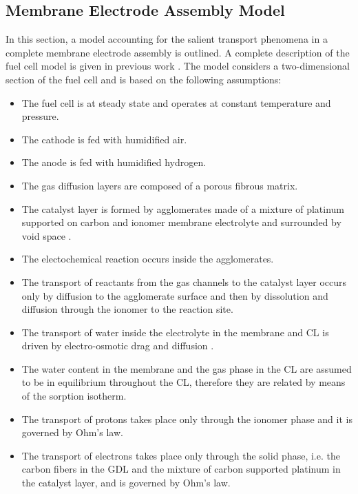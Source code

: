 \documentclass[]{elsart}
\begin{document}
\subsection{Membrane Electrode Assembly Model} \label{sec:CS:MEA}
  In this section, a model accounting for the salient transport phenomena in a complete membrane electrode assembly is outlined. A complete description of the fuel cell model is given in previous work \cite{Secanell07_thesis,Secanell07a,Secanell07b}. The model considers a two-dimensional section of the fuel cell and is based on the following assumptions: 
\begin{itemize}
	\item The fuel cell is at steady state and operates at constant temperature and pressure.
	\item The cathode is fed with humidified air.
	\item The anode is fed with humidified hydrogen.
	\item The gas diffusion layers are composed of a porous fibrous matrix.
	\item The catalyst layer is formed by agglomerates made of a mixture of platinum supported on carbon and ionomer membrane electrolyte and surrounded by void space \cite{Secanell07b}.
   	\item The electochemical reaction occurs inside the agglomerates.
	\item The transport of reactants from the gas channels to the catalyst layer occurs only by diffusion to the agglomerate surface and then by dissolution and diffusion through the ionomer to the reaction site.
	\item The transport of water inside the electrolyte in the membrane and CL is driven by electro-osmotic drag and diffusion \cite{Secanell07_thesis,Springer91, Sui05}.
	\item The water content in the membrane and the gas phase in the CL are assumed to be in equilibrium throughout the CL, therefore they are related by means of the sorption isotherm.
	\item The transport of protons takes place only through the ionomer phase and it is governed by Ohm's law.
	 \item The transport of electrons takes place only through the solid phase, i.e. the carbon fibers in the GDL and the mixture of carbon supported platinum in the catalyst layer, and is governed by Ohm's law.
\end{itemize}

\end{document}
